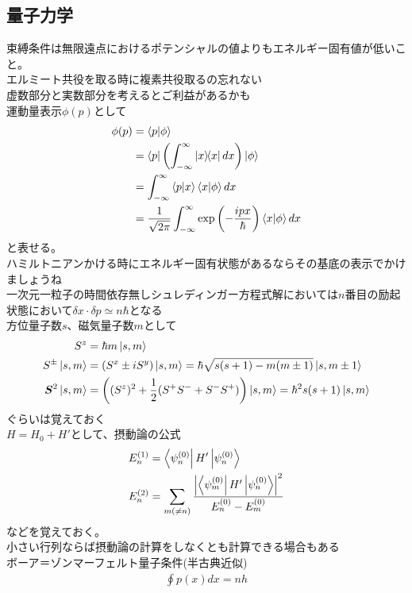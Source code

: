 \documentclass{ltjsarticle}
\begin{document}
  \subsection{量子力学}
  束縛条件は無限遠点におけるポテンシャルの値よりもエネルギー固有値が低いこと。\\
  エルミート共役を取る時に複素共役取るの忘れない\\
  虚数部分と実数部分を考えるとご利益があるかも\\
  運動量表示$\phi(p)$として
  \begin{align}
    \phi(p)
    &=\bra{p}\ket{\phi}\\
    &=\bra{p}\left( \int^\infty_{-\infty}\ketbra{x} dx \right) \ket{\phi}\\
    &=\int^\infty_{-\infty}\bra{p}\ket{x}\bra{x}\ket{\phi}dx\\
    &=\frac{1}{\sqrt{2\pi}}\int^\infty_{-\infty}\exp\left( -\frac{ipx}{\hbar} \right)\bra{x}\ket{\phi}dx\\
  \end{align}
  と表せる。\\
  ハミルトニアンかける時にエネルギー固有状態があるならその基底の表示でかけましょうね\\
  一次元一粒子の時間依存無しシュレディンガー方程式解においては$n$番目の励起状態において$\delta x\cdot \delta p\simeq n\hbar$となる\\
  方位量子数$s$、磁気量子数$m$として
  \begin{align}
    S^z&=\hbar m\ket{s,m}\\
    S^\pm\ket{s,m}&=(S^x\pm iS^y)\ket{s,m}=\hbar\sqrt{s(s+1)-m(m\pm 1)}\ket{s,m\pm 1}\\
    \bm{S}^2\ket{s,m}&=\left((S^z)^2+\frac{1}{2}(S^+S^-+S^-S^+)\right)\ket{s,m}=\hbar^2s(s+1)\ket{s,m}\\
  \end{align}
  ぐらいは覚えておく\\
  $H=H_0+H'$として、摂動論の公式
  \begin{align}
    E_n^{(1)}&=\bra{\psi_n^{(0)}}H' \ket{\psi_n^{(0)}}\\
    E_n^{(2)}&=\sum_{m(\neq n)}\frac{\abs{\bra{\psi_m^{(0)}}H' \ket{\psi_n^{(0)}}}^2}{E_n^{(0)}-E_m^{(0)}}
  \end{align}
  などを覚えておく。\\
  小さい行列ならば摂動論の計算をしなくとも計算できる場合もある\\
  ボーア＝ゾンマーフェルト量子条件(半古典近似)
  \begin{align}
    \oint p(x)dx=nh
  \end{align}
\end{document}
